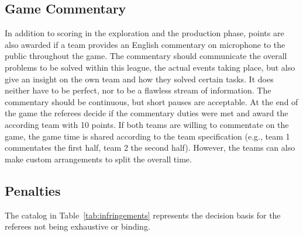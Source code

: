 \documentclass[12pt,twoside]{article}
\newcommand{\reftab}[1]{Table~\ref{#1}}
\begin{document}
\subsection{Game Commentary}
In addition to scoring in the exploration and the production phase,
points are also awarded if a team provides an English commentary on
microphone to the public throughout the game. The commentary should
communicate the overall problems to be solved within this league, the
actual events taking place, but also give an insight on the own team
and how they solved certain tasks. It does neither have to be perfect,
nor to be a flawless stream of information. The commentary should be
continuous, but short pauses are acceptable. At the end of the game
the referees decide if the commentary duties were met and award the
according team with 10 points. If both teams are willing to commentate
on the game, the game time is shared according to the team
specification (e.g., team 1 commentates the first half, team 2 the
second half). However, the teams can also make custom arrangements to
split the overall time.

\subsection{Penalties}
The catalog in \reftab{tab:infringements} represents the decision
basis for the referees not being exhaustive or binding.
%
\end{document}
